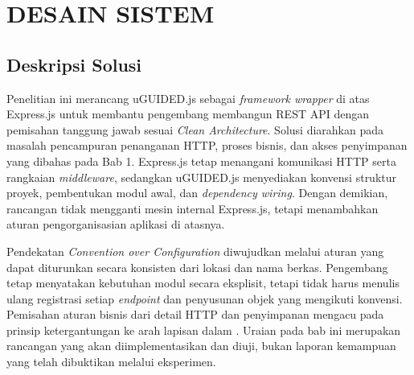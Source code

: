 \documentclass[12pt,a4paper,oneside]{report}
\begin{document}
\chapter{DESAIN SISTEM}
\label{chap:desain_sistem}

\section{Deskripsi Solusi}
\label{sec:deskripsi_solusi}
Penelitian ini merancang uGUIDED.js sebagai \textit{framework wrapper} di atas Express.js untuk membantu pengembang membangun REST API dengan pemisahan tanggung jawab sesuai \textit{Clean Architecture}. Solusi diarahkan pada masalah pencampuran penanganan HTTP, proses bisnis, dan akses penyimpanan yang dibahas pada Bab 1. Express.js tetap menangani komunikasi HTTP serta rangkaian \textit{middleware}, sedangkan uGUIDED.js menyediakan konvensi struktur proyek, pembentukan modul awal, dan \textit{dependency wiring}. Dengan demikian, rancangan tidak mengganti mesin internal Express.js, tetapi menambahkan aturan pengorganisasian aplikasi di atasnya.

Pendekatan \textit{Convention over Configuration} diwujudkan melalui aturan yang dapat diturunkan secara konsisten dari lokasi dan nama berkas. Pengembang tetap menyatakan kebutuhan modul secara eksplisit, tetapi tidak harus menulis ulang registrasi setiap \textit{endpoint} dan penyusunan objek yang mengikuti konvensi. Pemisahan aturan bisnis dari detail HTTP dan penyimpanan mengacu pada prinsip ketergantungan ke arah lapisan dalam \cite{martin2017clean}. Uraian pada bab ini merupakan rancangan yang akan diimplementasikan dan diuji, bukan laporan kemampuan yang telah dibuktikan melalui eksperimen.
\end{document}
